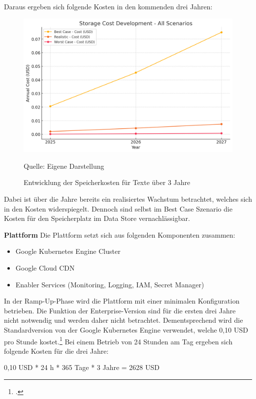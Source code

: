 Daraus ergeben sich folgende Kosten in den kommenden drei Jahren:
\begin{figure}[htbp]
    \includegraphics[width=\textwidth, height=\textheight, keepaspectratio]{abbildungen/Kosten_Speicher_Text}
    \caption{Entwicklung der Speicherkosten für Texte über 3 Jahre}
    \label{fig:KostenentwicklungSpeicherText}
    \raggedright Quelle: Eigene Darstellung
\end{figure}

Dabei ist über die Jahre bereits ein realisiertes Wachstum betrachtet, welches sich in den Kosten widerspiegelt.
Dennoch sind selbst im Best Case Szenario die Kosten für den Speicherplatz im Data Store vernachlässigbar.

\textbf{Plattform}\newline
Die Plattform setzt sich aus folgenden Komponenten zusammen:
\begin{itemize}
    \item Google Kubernetes Engine Cluster
    \item Google Cloud CDN
    \item Enabler Services (Monitoring, Logging, IAM, Secret Manager)
\end{itemize}

In der Ramp-Up-Phase wird die Plattform mit einer minimalen Konfiguration betrieben.
Die Funktion der Enterprise-Version sind für die ersten drei Jahre nicht notwendig und werden daher nicht betrachtet.
Dementsprechend wird die Standardversion von der Google Kubernetes Engine verwendet, welche 0,10 \ac{USD} pro Stunde kostet.\footcite{GoogleKubernetesEnginePricing2025}
Bei einem Betrieb von 24 Stunden am Tag ergeben sich folgende Kosten für die drei Jahre:

0,10 \ac{USD} * 24 h * 365 Tage * 3 Jahre = 2628 \ac{USD}

